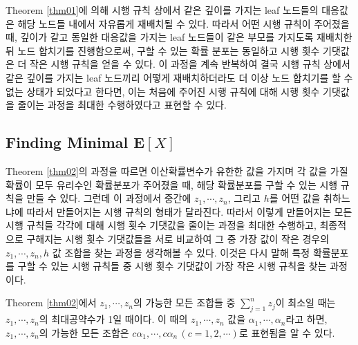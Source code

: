 \documentclass[11pt]{article}
\begin{document}
Theorem \ref{thm01}에 의해 시행 규칙 상에서 같은 깊이를 가지는 leaf 노드들의 대응값은 해당 노드들 내에서 자유롭게 재배치될 수 있다. 따라서 어떤 시행 규칙이 주어졌을 때, 깊이가 같고 동일한 대응값을 가지는 leaf 노드들이 같은 부모를 가지도록 재배치한 뒤 노드 합치기를 진행함으로써, 구할 수 있는 확률 분포는 동일하고 시행 횟수 기댓값은 더 작은 시행 규칙을 얻을 수 있다. 이 과정을 계속 반복하여 결국 시행 규칙 상에서 같은 깊이를 가지는 leaf 노드끼리 어떻게 재배치하더라도 더 이상 노드 합치기를 할 수 없는 상태가 되었다고 한다면, 이는 처음에 주어진 시행 규칙에 대해 시행 횟수 기댓값을 줄이는 과정을 최대한 수행하였다고 표현할 수 있다.

\subsection{Finding Minimal $\textbf{E}[X]$} \label{subsection3-5}
Theorem \ref{thm02}의 과정을 따르면 이산확률변수가 유한한 값을 가지며 각 값을 가질 확률이 모두 유리수인 확률분포가 주어졌을 때, 해당 확률분포를 구할 수 있는 시행 규칙을 만들 수 있다. 그런데 이 과정에서 중간에 $z_{1}, \cdots, z_{n}$, 그리고 $h$를 어떤 값을 취하느냐에 따라서 만들어지는 시행 규칙의 형태가 달라진다. 따라서 이렇게 만들어지는 모든 시행 규칙들 각각에 대해 시행 횟수 기댓값을 줄이는 과정을 최대한 수행하고, 최종적으로 구해지는 시행 횟수 기댓값들을 서로 비교하여 그 중 가장 값이 작은 경우의 $z_{1}, \cdots, z_{n}, h$ 값 조합을 찾는 과정을 생각해볼 수 있다. 이것은 다시 말해 특정 확률분포를 구할 수 있는 시행 규칙들 중 시행 횟수 기댓값이 가장 작은 시행 규칙을 찾는 과정이다.

Theorem \ref{thm02}에서 $z_{1}, \cdots, z_{n}$의 가능한 모든 조합들 중 $\displaystyle \sum_{j=1}^{n}z_{j}$이 최소일 때는 $z_{1}, \cdots, z_{n}$의 최대공약수가 1일 때이다. 이 때의 $z_{1}, \cdots, z_{n}$ 값을 $\alpha_{1}, \cdots, \alpha_{n}$라고 하면, $z_{1}, \cdots, z_{n}$의 가능한 모든 조합은 $c\alpha_{1}, \cdots, c\alpha_{n} \, (c = 1, 2, \cdots)$로 표현됨을 알 수 있다.
\end{document}

